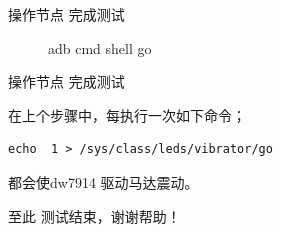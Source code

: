 \begin{frame}[fragile]{操作节点 完成测试}
\begin{figure}[htbp]
\begin{center}
  \caption{adb cmd shell go}
  \label{adb cmd shell go}
  \end{center}
  \vspace{-0.5em}
  \end{figure}

\end{frame}


\begin{frame}[fragile]{操作节点 完成测试}

在上个步骤中，每执行一次如下命令；
\begin{lstlisting}
echo  1 > /sys/class/leds/vibrator/go
\end{lstlisting}
都会使dw7914 驱动马达震动。








至此 测试结束，谢谢帮助！

\end{frame}
